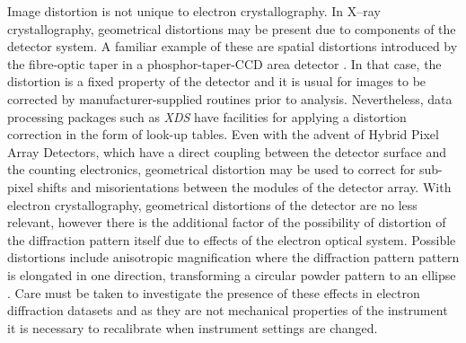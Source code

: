 \documentclass[preprint]{iucr}
\newcommand{\xds}{\emph{XDS}\xspace}
\begin{document}
Image distortion is not unique to electron crystallography. In X--ray
crystallography, geometrical distortions may be present due to components
of the detector system. A familiar example of these are spatial distortions
introduced by the fibre-optic taper in a phosphor-taper-CCD area detector
\cite{Stanton1992}. In that case, the distortion is a fixed property of the
detector and it is usual for images to be corrected by manufacturer-supplied
routines prior to analysis. Nevertheless, data processing packages such as \xds
have facilities for applying a distortion correction in the form of look-up
tables. Even with the advent of Hybrid Pixel Array Detectors, which have a
direct coupling between the detector surface and the counting electronics,
geometrical distortion may be used to correct for sub-pixel shifts and
misorientations between the modules of the detector array. With electron
crystallography, geometrical distortions of the detector are no less relevant,
however there is the additional factor of the possibility of distortion of
the diffraction pattern itself due to effects of the electron optical system.
Possible distortions include
anisotropic magnification where the diffraction pattern pattern is elongated
in one direction, transforming a circular powder pattern to an ellipse
\cite{lenscorr_2dx:2006,Clabbers2017}. Care must be taken to investigate the
presence of these effects in electron diffraction datasets and as they are
not mechanical properties of the instrument it is necessary to recalibrate
when instrument settings are changed.
\end{document}
